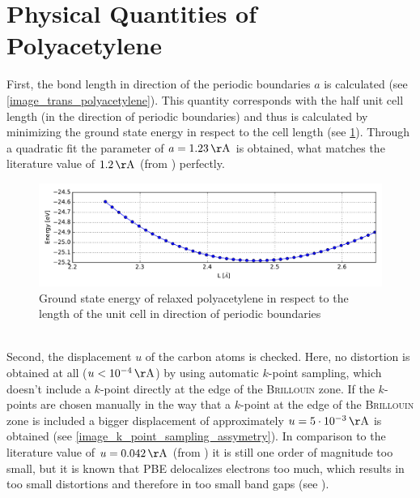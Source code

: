 \section{Physical Quantities of Polyacetylene}
First, the bond length in direction of the periodic boundaries $a$ is calculated (see \cref{image_trans_polyacetylene}). This quantity corresponds with the half unit cell length (in the direction of periodic boundaries) and thus is calculated by minimizing the ground state energy in respect to the cell length (see \cref{image_poly_cell_len}). Through a quadratic fit the parameter of $a = \unit[1.23]{\AA}$ is obtained, what matches the literature value of $\unit[1.2]{\AA}$ (from \cite{PhysRevLett.42.1698}) perfectly.\\
\begin{figure}[!h]
	\centering
	\includegraphics[width = 13cm]{Images/polyacetylene/convergence/unit_cell_length}
	\caption{Ground state energy of relaxed polyacetylene in respect to the length of the unit cell in direction of periodic boundaries}
	\label{image_poly_cell_len}
\end{figure}
\\
Second, the displacement $u$ of the carbon atoms is checked. Here, no distortion is obtained  at all ($u < \unit[10^{-4}]{\AA}$) by using automatic $k$-point sampling, which doesn't include a $k$-point directly at the edge of the \textsc{Brillouin} zone. If the $k$-points are chosen manually in the way that a $k$-point at the edge of the \textsc{Brillouin} zone is included a bigger displacement of approximately $u = \unit[5\cdot10^{-3}]{\AA}$ is obtained (see \cref{image_k_point_sampling_assymetry}). In comparison to the literature value of $u = \unit[0.042]{\AA}$ (from \cite{PhysRevLett.42.1698, doi:10.1021/cr990357p}) it is still one order of magnitude too small, but it is known that PBE delocalizes electrons too much, which results in too small distortions and therefore in too small band gaps (see \cite{JIANG2009120,PhysRevB.84}).\\
